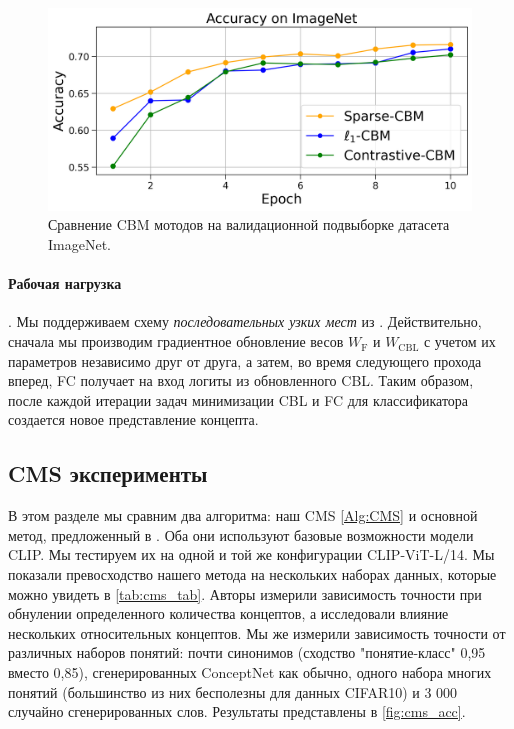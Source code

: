 \begin{figure}[t]
\begin{center}
\centerline{\includegraphics[width=\columnwidth]{./figures/cbms_acc_imnet.png}}
\caption{Сравнение CBM мотодов на валидационной подвыборке датасета ImageNet.}
\label{fig:cbm_acc}
\end{center}
\vskip -0.45in
\end{figure}
\paragraph{Рабочая нагрузка}. Мы поддерживаем схему \textit{последовательных узких мест} из \cite{koh2020concept}. Действительно, сначала мы производим градиентное обновление весов $W_{\mathrm{F}}$ и $W_{\mathrm{CBL}}$ с учетом их параметров независимо друг от друга, а затем, во время следующего прохода вперед, FC получает на вход логиты из обновленного CBL. Таким образом, после каждой итерации задач минимизации CBL и FC для классификатора создается новое представление концепта.

\subsection{CMS эксперименты}
\label{sec:cmsexp}

В этом разделе мы сравним два алгоритма: наш CMS \ref{Alg:CMS} и основной метод, предложенный в \cite{menon2022visual}. Оба они используют базовые возможности модели CLIP. Мы тестируем их на одной и той же конфигурации CLIP-ViT-L/14. Мы показали превосходство нашего метода на нескольких наборах данных, которые можно увидеть в \cref{tab:cms_tab}. Авторы \cite{kazmierczak2023clipqda} измерили зависимость точности при обнулении определенного количества концептов, а \cite{chauhan2023interactive} исследовали влияние нескольких относительных концептов. Мы же измерили зависимость точности от различных наборов понятий: почти синонимов (сходство "понятие-класс" 0,95 вместо 0,85), сгенерированных ConceptNet как обычно, одного набора многих понятий (большинство из них бесполезны для данных CIFAR10) и 3 000 случайно сгенерированных слов. Результаты представлены в \cref{fig:cms_acc}.